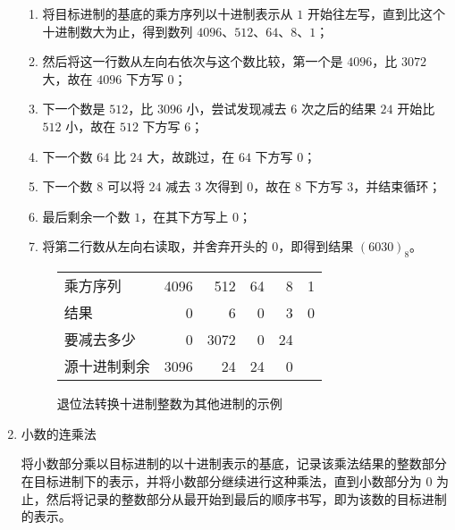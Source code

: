 \begin{enumerate}
                    \begin{enumerate}
                        \item 将目标进制的基底的乘方序列以十进制表示从 $1$ 开始往左写，直到比这个十进制数大为止，得到数列 $4096$、$512$、$64$、$8$、$1$；
                        \item 然后将这一行数从左向右依次与这个数比较，第一个是 $4096$，比 $3072$ 大，故在 $4096$ 下方写 $0$；
                        \item 下一个数是 $512$，比 $3096$ 小，尝试发现减去 $6$ 次之后的结果 $24$ 开始比 $512$ 小，故在 $512$ 下方写 $6$；
                        \item 下一个数 $64$ 比 $24$ 大，故跳过，在 $64$ 下方写 $0$；
                        \item 下一个数 $8$ 可以将 $24$ 减去 $3$ 次得到 $0$，故在 $8$ 下方写 $3$，并结束循环；
                        \item 最后剩余一个数 $1$，在其下方写上 $0$；
                        \item 将第二行数从左向右读取，并舍弃开头的 $0$，即得到结果 $(6030)_8$。
                    \end{enumerate}

                    \begin{figure}
                        \centering
                        \begin{tabular}{lrrrrr}
                            乘方序列     & 4096 &  512 & 64 &  8 & 1 \\
                            结果         & 0    &    6 &  0 &  3 & 0 \\ \hline
                            要减去多少   & 0    & 3072 &  0 & 24 &   \\
                            源十进制剩余 & 3096 &   24 & 24 &  0 &
                        \end{tabular}
                        \caption{退位法转换十进制整数为其他进制的示例}
                        \label{fig:ArithBasics/positional-notation-presentation-and-conversion/conversion/from-decimal/descending-subtraction-integer}
                    \end{figure}
                \item 小数的连乘法

                    将小数部分乘以目标进制的以十进制表示的基底，记录该乘法结果的整数部分在目标进制下的表示，并将小数部分继续进行这种乘法，直到小数部分为 0 为止，然后将记录的整数部分从最开始到最后的顺序书写，即为该数的目标进制的表示。


\end{enumerate}
